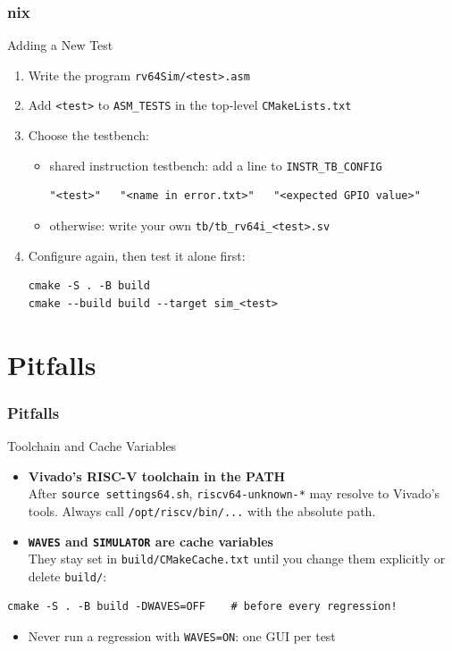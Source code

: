 \documentclass{beamer}
\newcommand{\astitle}{nix}
\newcommand{\assubtitle}{nix}
\newcommand{\cmd}[1]{\texttt{#1}}
\begin{document}
\renewcommand{\assubtitle}{Adding a New Test}
\begin{frame}[fragile]
\frametitle{\astitle}
\begin{block}{\assubtitle}
  \begin{enumerate}
    \item Write the program \cmd{rv64Sim/<test>.asm}
    \item Add \cmd{<test>} to \cmd{ASM\_TESTS} in the top-level \cmd{CMakeLists.txt}
    \item Choose the testbench:
    \begin{itemize}
      \item shared instruction testbench: add a line to \cmd{INSTR\_TB\_CONFIG}
\begin{lstlisting}
"<test>"   "<name in error.txt>"   "<expected GPIO value>"
\end{lstlisting}
      \item otherwise: write your own \cmd{tb/tb\_rv64i\_<test>.sv}
    \end{itemize}
    \item Configure again, then test it alone first:
\begin{lstlisting}[style=sh]
cmake -S . -B build
cmake --build build --target sim_<test>
\end{lstlisting}
  \end{enumerate}
\end{block}
\end{frame}

\section{Pitfalls}
\renewcommand{\astitle}{Pitfalls}
\renewcommand{\assubtitle}{Toolchain and Cache Variables}
\begin{frame}[fragile]
\frametitle{\astitle}
\begin{block}{\assubtitle}
  \begin{itemize}
    \item \textbf{Vivado's RISC-V toolchain in the PATH}\\
      After \cmd{source settings64.sh}, \cmd{riscv64-unknown-*} may resolve to Vivado's tools.
      Always call \cmd{/opt/riscv/bin/...} with the absolute path.
    \item \textbf{\cmd{WAVES} and \cmd{SIMULATOR} are cache variables}\\
      They stay set in \cmd{build/CMakeCache.txt} until you change them explicitly
      or delete \cmd{build/}:
  \end{itemize}
\begin{lstlisting}[style=sh]
cmake -S . -B build -DWAVES=OFF    # before every regression!
\end{lstlisting}
  \begin{itemize}
    \item Never run a regression with \cmd{WAVES=ON}: one GUI per test
  \end{itemize}
\end{block}
\end{frame}
\end{document}
